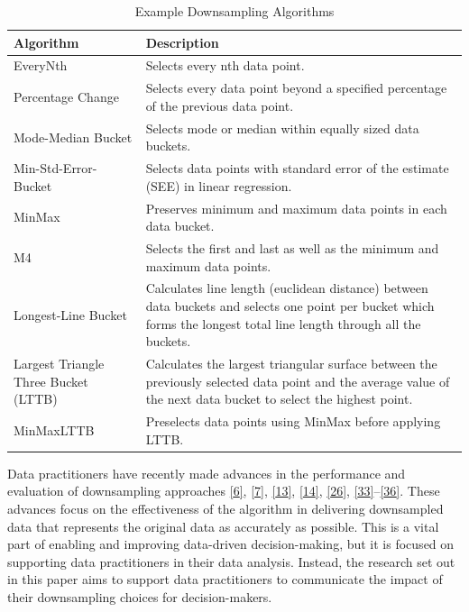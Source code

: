 \documentclass{article}
\begin{document}
\renewcommand{\arraystretch}{1.5}

\begin{table}[H]

\caption{\label{tab:unnamed-chunk-1}Example Downsampling Algorithms}
\centering
\begin{tabular}[t]{>{\raggedright\arraybackslash}p{1.8in}|>{\raggedright\arraybackslash}p{3.8in}}
\hline
Algorithm & Description\\
\hline
EveryNth & Selects every nth data point.\\
\hline
Percentage Change & Selects every data point beyond a specified percentage of the previous data point.\\
\hline
Mode-Median Bucket & Selects mode or median within equally sized data buckets.\\
\hline
Min-Std-Error-Bucket & Selects data points with standard error of the estimate (SEE) in linear regression.\\
\hline
MinMax & Preserves minimum and maximum data points in each data bucket.\\
\hline
M4 & Selects the first and last as well as the minimum and maximum data points.\\
\hline
Longest-Line Bucket & Calculates line length (euclidean distance) between data buckets and selects one point per bucket which forms the longest total
line length through all the buckets.\\
\hline
Largest Triangle Three Bucket (LTTB) & Calculates the largest triangular surface between the previously selected data point and the average value of the next data bucket to select the highest point.\\
\hline
MinMaxLTTB & Preselects data points using MinMax before applying LTTB.\\
\hline
\end{tabular}
\end{table}

Data practitioners have recently made advances in the performance and
evaluation of downsampling approaches
\protect\hyperlink{ref-datapoint}{{[}6{]}},
\protect\hyperlink{ref-MinMaxLTTB}{{[}7{]}},
\protect\hyperlink{ref-downsampling}{{[}13{]}},
\protect\hyperlink{ref-sampling}{{[}14{]}},
\protect\hyperlink{ref-plotly}{{[}26{]}},
\protect\hyperlink{ref-dashql}{{[}33{]}}--\protect\hyperlink{ref-MinMaxOrdered}{{[}36{]}}.
These advances focus on the effectiveness of the algorithm in delivering
downsampled data that represents the original data as accurately as
possible. This is a vital part of enabling and improving data-driven
decision-making, but it is focused on supporting data practitioners in
their data analysis. Instead, the research set out in this paper aims to
support data practitioners to communicate the impact of their
downsampling choices for decision-makers.
\end{document}
